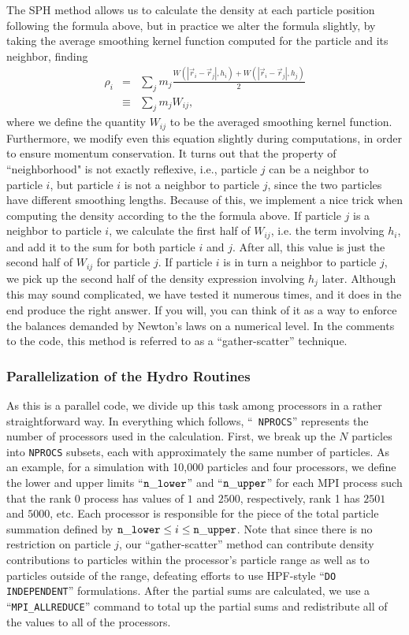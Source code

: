 The SPH method allows us to calculate the density at each particle
position following the formula above, but in practice we alter the formula
slightly, by taking the average smoothing kernel function computed for
the particle and its neighbor, finding
\begin{eqnarray}
\rho_i&=& \sum_j m_j
\frac{W(|\vec{r}_i-\vec{r}_j|,h_i)+W(|\vec{r}_i-\vec{r}_j|,h_j)}{2}\nonumber\\
&\equiv& \sum_j m_j W_{ij},    
\end{eqnarray}
where we define the quantity $W_{ij}$ to be the averaged smoothing
kernel function.  Furthermore, we modify even this equation slightly
during computations, in order to ensure momentum conservation.  It
turns out that the property of ``neighborhood" is not exactly
reflexive, i.e.,   particle $j$ can be a neighbor to particle $i$, but
particle $i$ is not a neighbor  to particle $j$, since the two
particles have different smoothing lengths.  Because of  this, we
implement a nice trick when computing the density according to the
the formula above.  If particle $j$ is a neighbor to particle $i$, we
calculate the first half of $W_{ij}$, i.e. the term involving $h_i$,
and add it to the sum for both particle $i$ and $j$.  After all, this
value is just the second half of $W_{ij}$ for particle $j$.  If
particle $i$ is in turn a neighbor to particle $j$, we pick up the
second half of the density expression involving $h_j$ later.  Although
this may sound complicated, we have tested it numerous times, and it
does in the end  
produce the right answer.  If you
will, you can think of it as a way to enforce the balances demanded by
Newton's laws on a numerical level.  In the
comments to the code, this method is referred to as a ``gather-scatter''
technique.    

\subsubsection{Parallelization of the Hydro Routines}
\label{nm:sph:pa}
As this is a parallel code, we divide up this task among processors
in a rather straightforward way.  In everything which follows, ``{\tt
NPROCS}'' represents the number of processors used in the calculation.
First, we break up the $N$ particles
into {\tt NPROCS} subsets, each with approximately the same number of
particles.  As an example, for a simulation with 10,000 particles and
four processors, we define the lower and upper limits ``${\tt n\_lower}$''
and ``${\tt n\_upper}$'' for each MPI process such that the rank 0
process has values of $1$ and $2500$, respectively, rank 1 has $2501$
and $5000$, etc.  Each processor is responsible for the piece of the
total particle summation defined by ${\tt n\_lower} \le i \le {\tt
n\_upper}$.  Note that since there is no restriction on particle $j$,
our ``gather-scatter'' method can contribute density contributions to
particles within the processor's particle range as well as to
particles outside of the range, defeating efforts to use HPF-style
``{\tt DO INDEPENDENT}'' formulations.  After the partial sums are
calculated, we use a ``{\tt MPI\_ALLREDUCE}'' command to total up the
partial sums and redistribute all of the values to all of the processors.

